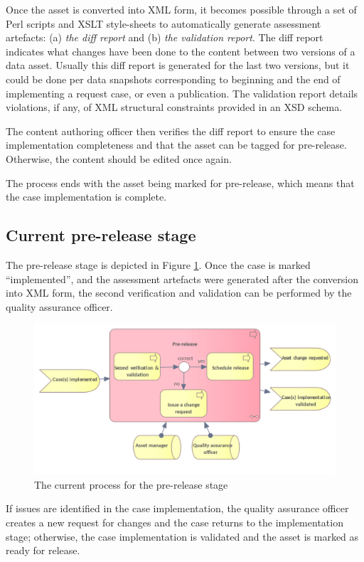 	Once the asset is converted into XML form, it becomes possible through a set of Perl scripts and XSLT style-sheets \citep{xslt3-Kay} to automatically generate assessment artefacts: (a) \textit{the diff report} and (b) \textit{the validation report}. The diff report indicates what changes have been done to the content between two versions of a data asset. Usually this diff report is generated for the last two versions, but it could be done per data snapshots corresponding to beginning and the end of implementing a request case, or even a publication. The validation report details violations, if any, of XML structural constraints provided in an XSD schema.
	
	The content authoring officer then verifies the diff report to ensure the case implementation completeness and that the asset can be tagged for pre-release. Otherwise, the content should be edited once again. 
	
	The process ends with the asset being marked for pre-release, which means that the case implementation is complete.
	
	\subsection{Current pre-release stage}
	\label{sec:pre-release-current}	

	The pre-release stage is depicted in Figure \ref{fig:pre-release-current}. Once the case is marked ``implemented'', and the assessment artefacts were generated after the conversion into XML form, the second verification and validation can be performed by the quality assurance officer. 
	
	\begin{figure}[h]
		\centering
		\includegraphics[width=.65\textwidth]{images/business/current/Pre-release.png}
		\caption{The current process for the pre-release stage}
		\label{fig:pre-release-current}
	\end{figure}

	If issues are identified in the case implementation, the quality assurance officer creates a new request for changes and the case returns to the implementation stage; otherwise, the case implementation is validated and the asset is marked as ready for release. 
	
